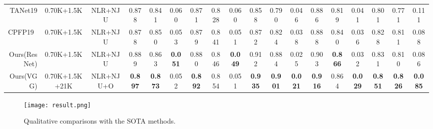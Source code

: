 \documentclass[journal]{IEEEtran}
\begin{document}
\begin{table*}[t]
{\begin{tabular}{r|cc|ccc|ccc|ccc|ccc|ccc}
    TANet19~\cite{chen2019three} & \multicolumn{1}{c}{0.70K+1.5K} & NLR+NJU & \multicolumn{1}{c}{0.878} & \multicolumn{1}{c}{0.841} & 0.060 & \multicolumn{1}{c}{0.871} & \multicolumn{1}{c}{0.828} & 0.060 & \multicolumn{1}{c}{0.858} & \multicolumn{1}{c}{0.790} & 0.046 & \multicolumn{1}{c}{0.886} & \multicolumn{1}{c}{0.819} & 0.041 & \multicolumn{1}{c}{0.801} & 0.771 & 0.111 \\
    CPFP19~\cite{zhao2019contrast} & \multicolumn{1}{c}{0.70K+1.5K} & NLR+NJU & \multicolumn{1}{c}{0.878} & \multicolumn{1}{c}{0.850} & 0.053 & \multicolumn{1}{c}{0.879} & \multicolumn{1}{c}{0.841} & 0.051 & \multicolumn{1}{c}{0.872} & \multicolumn{1}{c}{0.824} & 0.038 & \multicolumn{1}{c}{0.888} & \multicolumn{1}{c}{0.840} & 0.036 & \multicolumn{1}{c}{0.828} & 0.811 & 0.088 \\
    \rowcolor{mygray}
    Ours(ResNet) & {0.70K+1.5K} & NLR+NJU & {0.889} & {0.863} & \textbf{0.051} & {0.880} & {0.846} & \textbf{0.049} & {0.912} & {0.884} & 0.025 & {0.903} & {\textbf{0.866}} & 0.032 & {0.831} & 0.810 & 0.086 \\
    Ours(VGG) & \multicolumn{1}{c}{0.70K+1.5K+21K} & NLR+NJU+O & \multicolumn{1}{c}{\textbf{0.897}} & \multicolumn{1}{c}{\textbf{0.873}} & 0.052 & \multicolumn{1}{c}{\textbf{0.892}} & \multicolumn{1}{c}{0.854} & 0.051 & \multicolumn{1}{c}{\textbf{0.935}} & \multicolumn{1}{c}{\textbf{0.901}} & \textbf{0.021} & \multicolumn{1}{c}{\textbf{0.916}} & \multicolumn{1}{c}{0.864} & \textbf{0.029} & \multicolumn{1}{c}{\textbf{0.851}} & \textbf{0.826} & \textbf{0.085} \\
\toprule[1pt]
    \end{tabular}}
\label{table:All}
\end{table*}

\begin{figure*}\begin{center}
\texttt{[image: result.png]}
\end{center}
   \caption{Qualitative comparisons with the SOTA methods.}
\label{fig:result}
\end{figure*}
\end{document}
